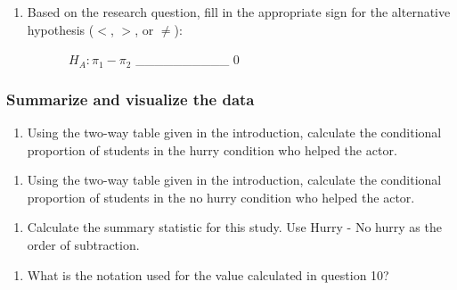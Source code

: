 \documentclass[
]{report}
\providecommand{\tightlist}{%
  \setlength{\itemsep}{0pt}\setlength{\parskip}{0pt}}
\begin{document}
\vspace{0.8in}

\begin{enumerate}
\def\labelenumi{\arabic{enumi}.}
\setcounter{enumi}{6}
\tightlist
\item
  Based on the research question, fill in the appropriate sign for the alternative hypothesis (\(<\), \(>\), or \(\neq\)):
  \vspace{0.1in}
\end{enumerate}

~~~~~~~~~~\(H_A: \pi_1 -\pi_2\) \_\_\_\_\_\_\_\_\_\_ 0

\hypertarget{summarize-and-visualize-the-data-1}{%
\subsubsection*{Summarize and visualize the data}\label{summarize-and-visualize-the-data-1}}

\begin{enumerate}
\def\labelenumi{\arabic{enumi}.}
\setcounter{enumi}{7}
\tightlist
\item
  Using the two-way table given in the introduction, calculate the conditional proportion of students in the hurry condition who helped the actor.
\end{enumerate}

\vspace{.3in}

\begin{enumerate}
\def\labelenumi{\arabic{enumi}.}
\setcounter{enumi}{8}
\tightlist
\item
  Using the two-way table given in the introduction, calculate the conditional proportion of students in the no hurry condition who helped the actor.
\end{enumerate}

\vspace{.3in}

\begin{enumerate}
\def\labelenumi{\arabic{enumi}.}
\setcounter{enumi}{9}
\tightlist
\item
  Calculate the summary statistic for this study. Use Hurry - No hurry as the order of subtraction.
\end{enumerate}

\vspace{0.4in}

\begin{enumerate}
\def\labelenumi{\arabic{enumi}.}
\setcounter{enumi}{10}
\tightlist
\item
  What is the notation used for the value calculated in question 10?
\end{enumerate}
\end{document}
